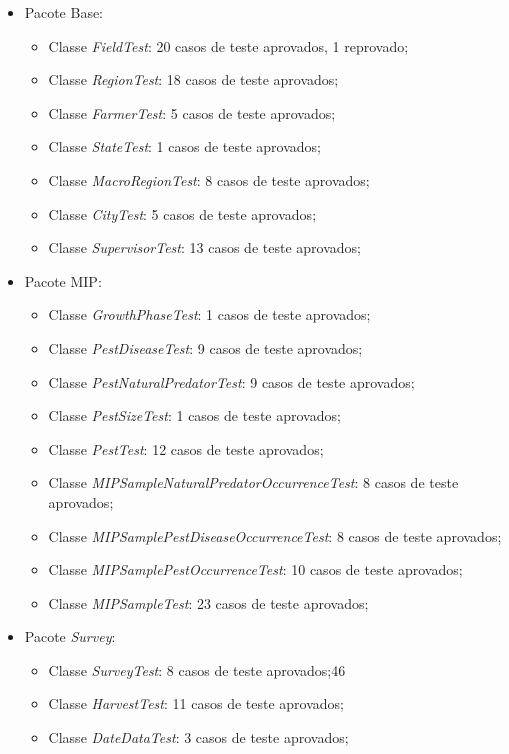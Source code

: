 \begin{itemize}
        \item Pacote Base:
\begin{itemize}
    \item Classe \textit{FieldTest}: 20 casos de teste aprovados, 1 reprovado;
    \item Classe \textit{RegionTest}: 18 casos de teste aprovados;
    \item Classe \textit{FarmerTest}: 5 casos de teste aprovados;
    \item Classe \textit{StateTest}: 1 casos de teste aprovados;
    \item Classe \textit{MacroRegionTest}: 8 casos de teste aprovados;
    \item Classe \textit{CityTest}: 5 casos de teste aprovados;
    \item Classe \textit{SupervisorTest}: 13 casos de teste aprovados;
\end{itemize}
  \item Pacote MIP:
  \begin{itemize} 
    \item Classe \textit{GrowthPhaseTest}: 1 casos de teste aprovados;
    \item Classe \textit{PestDiseaseTest}: 9 casos de teste aprovados;
    \item Classe \textit{PestNaturalPredatorTest}: 9 casos de teste aprovados;
    \item Classe \textit{PestSizeTest}: 1 casos de teste aprovados;
    \item Classe \textit{PestTest}: 12 casos de teste aprovados;
    \item Classe \textit{MIPSampleNaturalPredatorOccurrenceTest}: 8 casos de teste aprovados;
    \item Classe \textit{MIPSamplePestDiseaseOccurrenceTest}: 8 casos de teste aprovados;
    \item Classe \textit{MIPSamplePestOccurrenceTest}: 10 casos de teste aprovados;
    \item Classe \textit{MIPSampleTest}: 23 casos de teste aprovados;
\end{itemize}
  \item Pacote \textit{Survey}:
  \begin{itemize}   
    \item Classe \textit{SurveyTest}: 8 casos de teste aprovados;46
    \item Classe \textit{HarvestTest}: 11 casos de teste aprovados;
    \item Classe \textit{DateDataTest}: 3 casos de teste aprovados;

\end{itemize}
\end{itemize}
